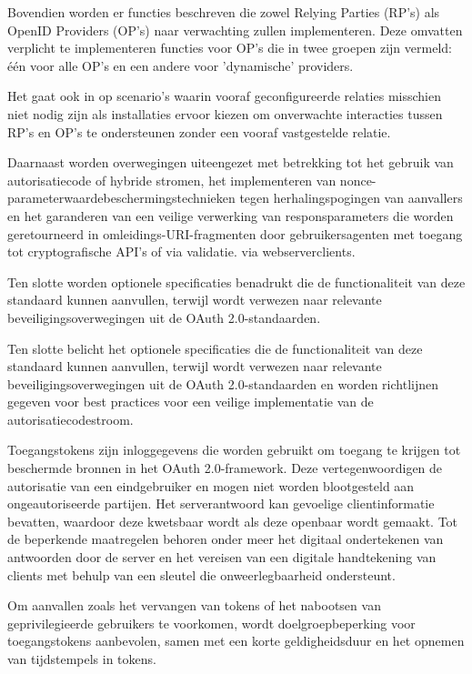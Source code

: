 Bovendien worden er functies beschreven die zowel Relying Parties (RP's) als OpenID Providers (OP's) naar verwachting zullen implementeren. Deze omvatten verplicht te implementeren functies voor OP's die in twee groepen zijn vermeld: één voor alle OP's en een andere voor 'dynamische' providers.

Het gaat ook in op scenario's waarin vooraf geconfigureerde relaties misschien niet nodig zijn als installaties ervoor kiezen om onverwachte interacties tussen RP's en OP's te ondersteunen zonder een vooraf vastgestelde relatie.

Daarnaast worden overwegingen uiteengezet met betrekking tot het gebruik van autorisatiecode of hybride stromen, het implementeren van nonce-parameterwaardebeschermingstechnieken tegen herhalingspogingen van aanvallers en het garanderen van een veilige verwerking van responsparameters die worden geretourneerd in omleidings-URI-fragmenten door gebruikersagenten met toegang tot cryptografische API's of via validatie. via webserverclients.

Ten slotte worden optionele specificaties benadrukt die de functionaliteit van deze standaard kunnen aanvullen, terwijl wordt verwezen naar relevante beveiligingsoverwegingen uit de OAuth 2.0-standaarden.


Ten slotte belicht het optionele specificaties die de functionaliteit van deze standaard kunnen aanvullen, terwijl wordt verwezen naar relevante beveiligingsoverwegingen uit de OAuth 2.0-standaarden en worden richtlijnen gegeven voor best practices voor een veilige implementatie van de autorisatiecodestroom.

Toegangstokens zijn inloggegevens die worden gebruikt om toegang te krijgen tot beschermde bronnen in het OAuth 2.0-framework. Deze vertegenwoordigen de autorisatie van een eindgebruiker en mogen niet worden blootgesteld aan ongeautoriseerde partijen. Het serverantwoord kan gevoelige clientinformatie bevatten, waardoor deze kwetsbaar wordt als deze openbaar wordt gemaakt. Tot de beperkende maatregelen behoren onder meer het digitaal ondertekenen van antwoorden door de server en het vereisen van een digitale handtekening van clients met behulp van een sleutel die onweerlegbaarheid ondersteunt.

Om aanvallen zoals het vervangen van tokens of het nabootsen van geprivilegieerde gebruikers te voorkomen, wordt doelgroepbeperking voor toegangstokens aanbevolen, samen met een korte geldigheidsduur en het opnemen van tijdstempels in tokens.

